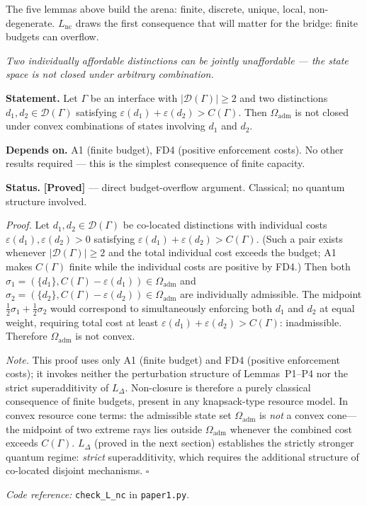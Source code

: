 \documentclass[11pt]{article}
\theoremstyle{remark}
\newcommand{\coderef}[2]{\smallskip\noindent\textit{Code reference:} \texttt{#1} in \texttt{#2}.}
\begin{document}
\noindent The five lemmas above build the arena: finite, discrete, unique, local, non-degenerate.  $L_{\mathrm{nc}}$ draws the first consequence that will matter for the bridge: finite budgets can overflow.

\begin{tcolorbox}[apfbox, title={Lemma $L_{\mathrm{nc}}$ (Non-Closure)}]
\textit{Two individually affordable distinctions can be jointly unaffordable --- the state space is not closed under arbitrary combination.}

\smallskip\noindent\textbf{Statement.}  Let $\Gamma$ be an interface with $|\mathcal{D}(\Gamma)| \ge 2$ and two distinctions $d_1, d_2 \in \mathcal{D}(\Gamma)$ satisfying $\varepsilon(d_1) + \varepsilon(d_2) > C(\Gamma)$.  Then $\Omega_{\mathrm{adm}}$ is not closed under convex combinations of states involving $d_1$ and $d_2$.

\smallskip\noindent\textbf{Depends on.}  A1 (finite budget), FD4 (positive enforcement costs).  No other results required --- this is the simplest consequence of finite capacity.

\smallskip\noindent\textbf{Status.}  \textbf{[Proved]} --- direct budget-overflow argument.  Classical; no quantum structure involved.

\smallskip\noindent\textit{Proof.}  Let $d_1, d_2 \in \mathcal{D}(\Gamma)$ be co-located distinctions with individual costs $\varepsilon(d_1), \varepsilon(d_2) > 0$ satisfying $\varepsilon(d_1) + \varepsilon(d_2) > C(\Gamma)$.  (Such a pair exists whenever $|\mathcal{D}(\Gamma)| \ge 2$ and the total individual cost exceeds the budget; A1 makes $C(\Gamma)$ finite while the individual costs are positive by FD4.)  Then both $\sigma_1 = (\{d_1\}, C(\Gamma) - \varepsilon(d_1)) \in \Omega_{\mathrm{adm}}$ and $\sigma_2 = (\{d_2\}, C(\Gamma) - \varepsilon(d_2)) \in \Omega_{\mathrm{adm}}$ are individually admissible.  The midpoint $\tfrac{1}{2}\sigma_1 + \tfrac{1}{2}\sigma_2$ would correspond to simultaneously enforcing both $d_1$ and $d_2$ at equal weight, requiring total cost at least $\varepsilon(d_1) + \varepsilon(d_2) > C(\Gamma)$: inadmissible.  Therefore $\Omega_{\mathrm{adm}}$ is not convex.

\smallskip\noindent\textit{Note.}  This proof uses only A1 (finite budget) and FD4 (positive enforcement costs); it invokes neither the perturbation structure of Lemmas~P1--P4 nor the strict superadditivity of $L_\Delta$.  Non-closure is therefore a purely classical consequence of finite budgets, present in any knapsack-type resource model.  In convex resource cone terms: the admissible state set $\Omega_{\mathrm{adm}}$ is \emph{not} a convex cone---the midpoint of two extreme rays lies outside $\Omega_{\mathrm{adm}}$ whenever the combined cost exceeds $C(\Gamma)$.  $L_\Delta$ (proved in the next section) establishes the strictly stronger quantum regime: \emph{strict} superadditivity, which requires the additional structure of co-located disjoint mechanisms.  \hfill$\square$

\coderef{check\_L\_nc}{paper1.py}
\end{tcolorbox}
\end{document}
